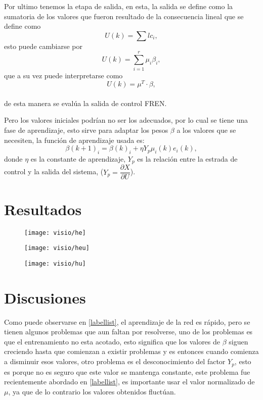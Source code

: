     Por ultimo tenemos la etapa de salida, en esta, la salida se define como la sumatoria de los valores que fueron resultado de la consecuencia lineal que se define como \begin{equation}
    \label{u}
    U(k)= \sum lc_{i},
    \end{equation} esto puede cambiarse por \begin{equation}
    U(k)=\sum_{i=1}^{r} \mu_i \beta_i,
    \end{equation} que a su vez  puede interpretarse como
    \begin{equation}
    \label{u}
    U(k)=\mu^T \cdot \beta ,
    \end{equation}\\
    de esta manera se evalúa la salida de control FREN.
    
    Pero los valores iniciales podrían no ser los adecuados, por lo cual se tiene una fase de aprendizaje, esto sirve para adaptar los pesos $\beta$ a los valores que se necesiten, la función de aprendizaje usada es: \begin{equation}
    \beta(k+1)_i=\beta(k)_i+\eta Y_p \mu_i(k) e_i(k),
    \end{equation} donde $\eta$ es la constante de aprendizaje, $Y_p$ es la relación entre la estrada de control y la salida del sistema, ($Y_p= \dfrac{\partial X}{\partial U}$).
    
    
    
   \section{Resultados}
   
    
\begin{figure}[h]
	\centering
	\texttt{[image: visio/he]}
	\caption{}
	\label{fig:he}
\end{figure}
\begin{figure}[h]
	\centering
	\texttt{[image: visio/heu]}
	\caption{}
	\label{fig:heu}
\end{figure}
\begin{figure}[h]
	\centering
	\texttt{[image: visio/hu]}
	\caption{}
	\label{fig:hu}
\end{figure}
    
    
    \section{Discusiones}
    
    Como puede observarse en \ref{labellist}, el aprendizaje de la red es rápido, pero se tienen algunos problemas que aun faltan por resolverse, uno de los problemas es que el entrenamiento no esta acotado, esto significa que los valores de $\beta$ siguen creciendo hasta que comienzan a existir problemas y es entonces cuando comienza a disminuir esos valores, otro problema es el desconocimiento del factor $Y_p$, esto es porque no es seguro que este valor se mantenga constante, este problema fue recientemente abordado en \cref{labellist}, es importante usar el valor normalizado de $\mu$, ya que de lo contrario los valores obtenidos fluctúan.
    